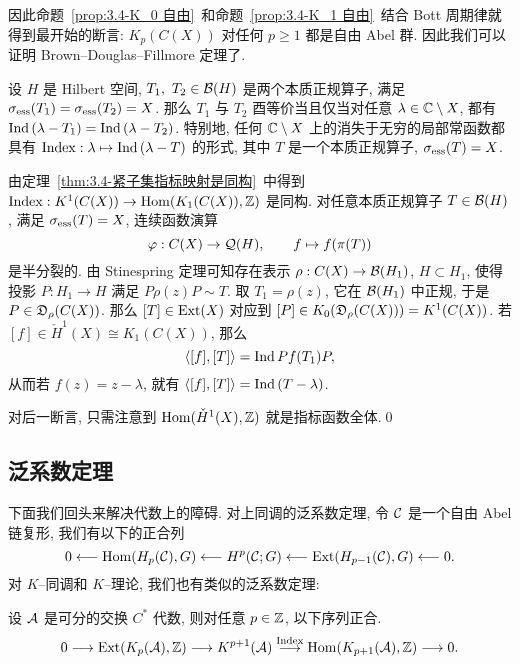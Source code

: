 因此命题~\ref{prop:3.4-K_0 自由}~和命题~\ref{prop:3.4-K_1 自由}~结合 Bott 周期律就得到最开始的断言: $ K_p(C(X)) $ 对任何 $ p\geqslant 1 $ 都是自由 Abel 群. 因此我们可以证明 Brown--Douglas--Fillmore 定理了.

\begin{Theorem}
	设 $ H $ 是 Hilbert 空间, $ T_1,\ T_2\in\mathcal{B}(H) $ 是两个本质正规算子, 满足 $ \sigma_{\text{ess}}(T_1)=\sigma_{\text{ess}}(T_2)=X $. 那么 $ T_1 $ 与 $ T_2 $ 酉等价当且仅当对任意 $ \lambda\in\mathbb{C}\setminus X $, 都有 $ \mathrm{Ind}\,(\lambda-T_1)=\mathrm{Ind}\,(\lambda-T_2) $. 特别地, 任何 $ \mathbb{C}\setminus X $ 上的消失于无穷的局部常函数都具有 $ \mathrm{Index} : \lambda\mapsto\mathrm{Ind}\,(\lambda-T) $ 的形式, 其中 $ T $ 是一个本质正规算子, $ \sigma_{\text{ess}}(T)=X $.
\end{Theorem}
\begin{Proof}
	由定理~\ref{thm:3.4-紧子集指标映射是同构}~中得到 $ \mathrm{Index} : K^1(C(X))\to\mathrm{Hom}(K_1(C(X)),\mathbb{Z}) $ 是同构. 对任意本质正规算子 $ T\in\mathcal{B}(H) $, 满足 $ \sigma_{\text{ess}}(T)=X $, 连续函数演算
	\[
		\varphi : C(X)\to\mathcal{Q}(H),\qquad f\mapsto f(\pi(T))
	\]
	是半分裂的. 由 Stinespring 定理可知存在表示 $ \rho : C(X)\to\mathcal{B}(H_1) $, $ H\subset H_1 $, 使得投影 $ P : H_1\to H $ 满足 $ P\rho(z)P\sim T $. 取 $ T_1=\rho(z) $, 它在 $ \mathcal{B}(H_1) $ 中正规, 于是 $ P\in\mathfrak{D}_{\rho}(C(X)) $. 那么 $ [T]\in\mathrm{Ext}(X) $ 对应到 $ [P]\in K_0(\mathfrak{D}_\rho(C(X)))=K^1(C(X)) $. 若 $ [f]\in\check{H}^1(X)\cong K_1(C(X)) $, 那么
	\[
		\left\langle [f],[T] \right\rangle=\mathrm{Ind}\, Pf(T_1)P,
	\]
	从而若 $ f(z)=z-\lambda $, 就有 $ \left\langle [f],[T] \right\rangle=\mathrm{Ind}\,(T-\lambda) $.

	对后一断言, 只需注意到 $ \mathrm{Hom}(\check{H}^1(X),\mathbb{Z}) $ 就是指标函数全体.\qed
\end{Proof}

\subsection{泛系数定理}

下面我们回头来解决代数上的障碍. 对上同调的泛系数定理, 令 $ \mathcal{C} $ 是一个自由 Abel 链复形, 我们有以下的正合列
\[
	0\longleftarrow\mathrm{Hom}(H_p(\mathcal{C}),G)\longleftarrow H^p(\mathcal{C};G)\longleftarrow\mathrm{Ext}(H_{p-1}(\mathcal{C}),G)\longleftarrow 0.
\]
对 $ K $--同调和 $ K $--理论, 我们也有类似的泛系数定理:

\begin{Theorem}
	设 $ \mathcal{A} $ 是可分的交换 $ C^* $ 代数, 则对任意 $ p\in\mathbb{Z} $, 以下序列正合.
	\[
		0\longrightarrow\mathrm{Ext}(K_p(\mathcal{A}),\mathbb{Z})\longrightarrow K^{p+1}(\mathcal{A})\stackrel{\mathrm{Index}}{\longrightarrow}\mathrm{Hom}(K_{p+1}(\mathcal{A}),\mathbb{Z})\longrightarrow 0.
	\]
\end{Theorem}

